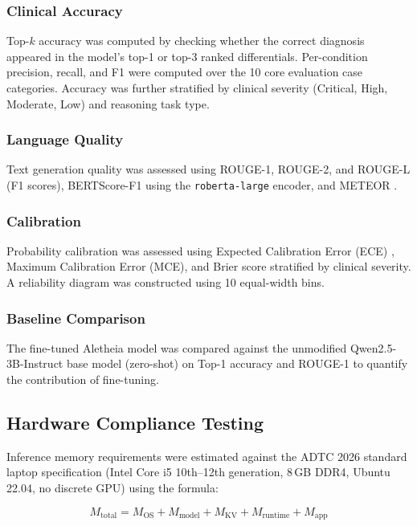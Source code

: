\documentclass[journal]{IEEEtran}
\begin{document}
\subsubsection{Clinical Accuracy}
Top-$k$ accuracy was computed by checking whether the correct
diagnosis appeared in the model's top-1 or top-3 ranked
differentials. Per-condition precision, recall, and F1 were
computed over the 10 core evaluation case categories. Accuracy
was further stratified by clinical severity (Critical, High,
Moderate, Low) and reasoning task type.

\subsubsection{Language Quality}
Text generation quality was assessed using ROUGE-1, ROUGE-2,
and ROUGE-L \cite{lin2004rouge} (F1 scores), BERTScore-F1
\cite{zhang2019bertscore} using the \texttt{roberta-large} encoder,
and METEOR \cite{banerjee2005meteor}.

\subsubsection{Calibration}
Probability calibration was assessed using Expected Calibration
Error (ECE) \cite{naeini2015ece}, Maximum Calibration Error (MCE),
and Brier score \cite{brier1950brier} stratified by clinical
severity. A reliability diagram was constructed using 10 equal-width
bins.

\subsubsection{Baseline Comparison}
The fine-tuned Aletheia model was compared against the unmodified
Qwen2.5-3B-Instruct base model (zero-shot) on Top-1 accuracy and
ROUGE-1 to quantify the contribution of fine-tuning.

\subsection{Hardware Compliance Testing}

Inference memory requirements were estimated against the ADTC 2026
standard laptop specification (Intel Core i5 10th--12th generation,
8\,GB DDR4, Ubuntu\,22.04, no discrete GPU) using the formula:

\begin{equation}
  M_{\text{total}} = M_{\text{OS}} + M_{\text{model}} + M_{\text{KV}} + M_{\text{runtime}} + M_{\text{app}}
  \label{eq:memory}
\end{equation}
\end{document}
